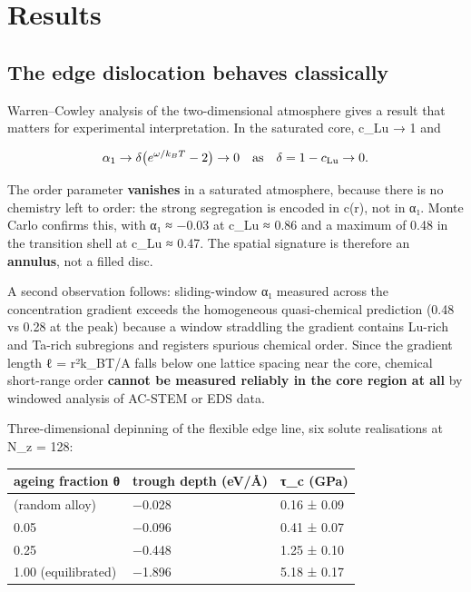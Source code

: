 \hypertarget{results}{%
\section{Results}\label{sec:results}}

\hypertarget{the-edge-dislocation-behaves-classically}{%
\subsection{The edge dislocation behaves classically}\label{sec:the-edge-dislocation-behaves-classically}}

Warren--Cowley analysis of the two-dimensional atmosphere gives a result that matters for experimental interpretation. In the saturated core, c\_Lu → 1 and

\[\alpha_1 \to \delta\bigl(e^{\omega/k_BT} - 2\bigr) \to 0 \quad\text{as}\quad \delta = 1 - c_{\rm Lu} \to 0.\]

The order parameter \textbf{vanishes} in a saturated atmosphere, because there is no chemistry left to order: the strong segregation is encoded in c(r), not in α₁. Monte Carlo confirms this, with α₁ ≈ −0.03 at c\_Lu ≈ 0.86 and a maximum of 0.48 in the transition shell at c\_Lu ≈ 0.47. The spatial signature is therefore an \textbf{annulus}, not a filled disc.

A second observation follows: sliding-window α₁ measured across the concentration gradient exceeds the homogeneous quasi-chemical prediction (0.48 vs 0.28 at the peak) because a window straddling the gradient contains Lu-rich and Ta-rich subregions and registers spurious chemical order. Since the gradient length ℓ = r²k\_BT/A falls below one lattice spacing near the core, chemical short-range order \textbf{cannot be measured reliably in the core region at all} by windowed analysis of AC-STEM or EDS data.

Three-dimensional depinning of the flexible edge line, six solute realisations at N\_z = 128:

\begin{longtable}[]{@{}lll@{}}
\toprule\noalign{}
ageing fraction θ & trough depth (eV/Å) & τ\_c (GPa) \\
\midrule\noalign{}
\endhead
\bottomrule\noalign{}
\endlastfoot
0.00 (random alloy) & −0.028 & 0.16 ± 0.09 \\
0.05 & −0.096 & 0.41 ± 0.07 \\
0.25 & −0.448 & 1.25 ± 0.10 \\
1.00 (equilibrated) & −1.896 & 5.18 ± 0.17 \\
\end{longtable}

